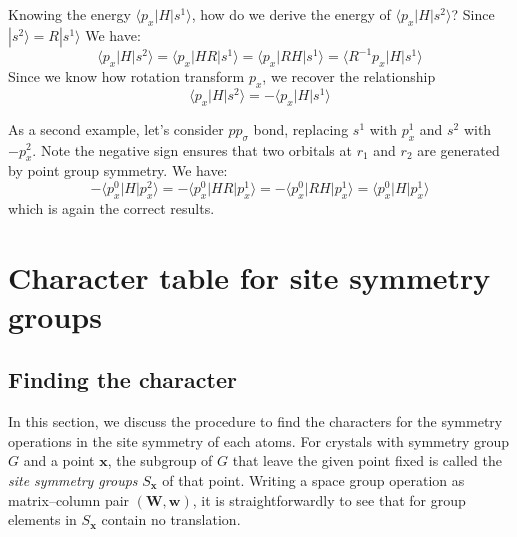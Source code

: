 \documentclass{article}
\begin{document}
Knowing the energy $\langle p_x | H | s^1 \rangle$, how do we derive the energy 
of $\langle p_x | H | s^2 \rangle$? Since $| s^2 \rangle = R | s^1 \rangle$ We have:
\begin{equation}
    \langle p_x | H | s^2 \rangle = \langle p_x | H R | s^1 \rangle
    = \langle p_x | R H | s^1 \rangle = \langle R^{-1} p_x | H | s^1 \rangle
\end{equation}
Since we know how rotation transform $p_x$, we recover the relationship 
\begin{equation}
    \langle p_x | H | s^2 \rangle = - \langle p_x | H | s^1 \rangle
\end{equation}

As a second example, let's consider $pp_{\sigma}$ bond, replacing $s^1$ with $p_x^1$ 
and $s^2$ with $-p_x^2$. Note the negative sign ensures that two orbitals at $r_1$ and $r_2$
are generated by point group symmetry. 
We have:
\begin{equation}
    - \langle p_x^0 | H | p_x^2 \rangle =  - \langle p_x^0 | HR | p_x^1 \rangle 
    = - \langle p_x^0 | RH | p_x^1 \rangle = \langle p_x^0 | H | p_x^1 \rangle
\end{equation} 
which is again the correct results. 



\newpage
\appendix

\section{Character table for site symmetry groups}
\subsection{Finding the character}
In this section, we discuss the procedure to find the characters for the 
symmetry operations in the site symmetry of each atoms. For crystals with 
symmetry group $G$ and a point $\mathbf{x}$, the subgroup of $G$ that leave
the given point fixed is called the \emph{site symmetry groups} $S_{\mathbf{x}}$ of that point. 
Writing a space group operation as matrix--column pair $(\mathbf{W},\mathbf{w})$, 
it is straightforwardly to see that for group elements in $S_{\mathbf{x}}$ 
contain no translation. 
\end{document}
